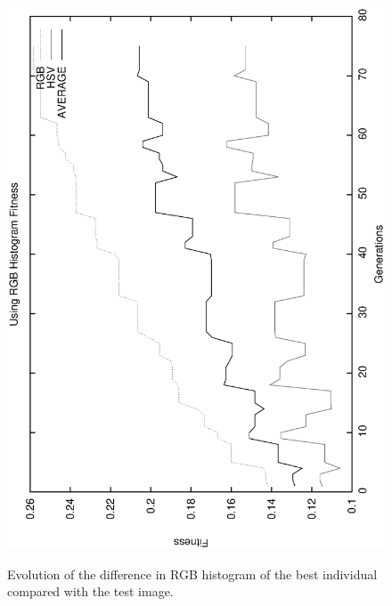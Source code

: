 \documentclass[conference]{IEEEtran}
\begin{document}
\begin{figure}
   \includegraphics[scale =0.4] {images/rgbgens.eps}
\label{fig:gensrgb}
\caption{Evolution of the difference in RGB histogram of the best individual compared with the test image. }
\end{figure}
\end{document}
